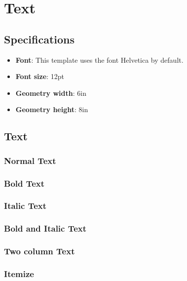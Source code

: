 \section{Text}
\subsection{Specifications}

\begin{itemize}
    \item \textbf{Font}: This template uses the font Helvetica by default.
    \item \textbf{Font size}: 12pt
    \item \textbf{Geometry width}: 6in
    \item \textbf{Geometry height}: 8in
\end{itemize}

\subsection{Text}

\subsubsection{Normal Text}
\lipsum[1]

\subsubsection{Bold Text}
\textbf{\lipsum[2]}

\subsubsection{Italic Text}
\textit{\lipsum[3]}

\subsubsection{Bold and Italic Text}
\textbf{\textit{\lipsum[4]}}

\subsubsection{Two column Text}

\begin{multicols}{2}
\lipsum[5-7]
\end{multicols}

\subsubsection{Itemize}

